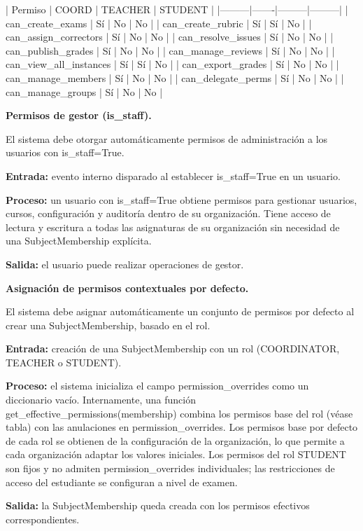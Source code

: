 \begin{functional}
| Permiso | COORD | TEACHER | STUDENT |
|---------|-------|---------|---------|
| can\_create\_exams | Sí | No | No |
| can\_create\_rubric | Sí | Sí | No |
| can\_assign\_correctors | Sí | No | No |
| can\_resolve\_issues | Sí | No | No |
| can\_publish\_grades | Sí | No | No |
| can\_manage\_reviews | Sí | No | No |
| can\_view\_all\_instances | Sí | Sí | No |
| can\_export\_grades | Sí | No | No |
| can\_manage\_members | Sí | No | No |
| can\_delegate\_perms | Sí | No | No |
| can\_manage\_groups | Sí | No | No |

  \begin{functional}
    \item \textbf{Permisos de gestor (is\_staff).}

    El sistema debe otorgar automáticamente permisos de administración a los usuarios con is\_staff=True.

    \textbf{Entrada:} evento interno disparado al establecer is\_staff=True en un usuario.

    \textbf{Proceso:} un usuario con is\_staff=True obtiene permisos para gestionar usuarios, cursos, configuración y auditoría dentro de su organización. Tiene acceso de lectura y escritura a todas las asignaturas de su organización sin necesidad de una SubjectMembership explícita.

    \textbf{Salida:} el usuario puede realizar operaciones de gestor.

    \item \textbf{Asignación de permisos contextuales por defecto.}

    El sistema debe asignar automáticamente un conjunto de permisos por defecto al crear una SubjectMembership, basado en el rol.

    \textbf{Entrada:} creación de una SubjectMembership con un rol (COORDINATOR, TEACHER o STUDENT).

    \textbf{Proceso:} el sistema inicializa el campo permission\_overrides como un diccionario vacío. Internamente, una función get\_effective\_permissions(membership) combina los permisos base del rol (véase tabla) con las anulaciones en permission\_overrides. Los permisos base por defecto de cada rol se obtienen de la configuración de la organización, lo que permite a cada organización adaptar los valores iniciales. Los permisos del rol STUDENT son fijos y no admiten permission\_overrides individuales; las restricciones de acceso del estudiante se configuran a nivel de examen.

    \textbf{Salida:} la SubjectMembership queda creada con los permisos efectivos correspondientes.


\end{functional}
\end{functional}
